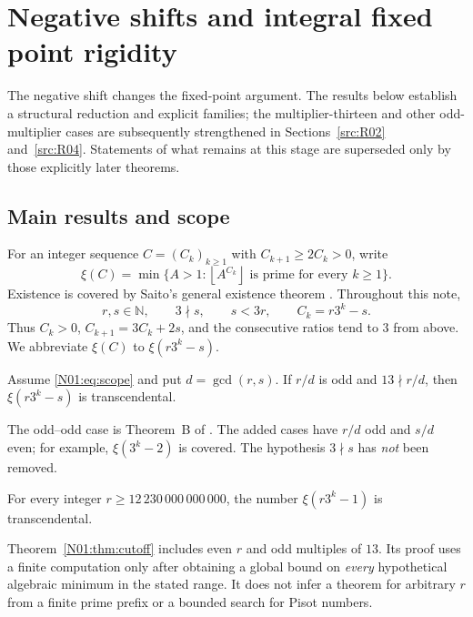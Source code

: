 \documentclass[11pt,a4paper]{article}
\theoremstyle{definition}\newtheorem{definition}[theorem]{Definition}
\theoremstyle{remark}\newtheorem{remark}[theorem]{Remark}
\newcommand{\N}{\mathbb N}\newcommand{\Z}{\mathbb Z}\newcommand{\Q}{\mathbb Q}
\newcommand{\floor}[1]{\left\lfloor#1\right\rfloor}
\begin{document}
\endgroup

\section{Negative shifts and integral fixed point rigidity}\label{src:N01}
The negative shift changes the fixed-point argument. The results below establish a structural reduction and explicit families; the multiplier-thirteen and other odd-multiplier cases are subsequently strengthened in Sections~\ref{src:R02} and~\ref{src:R04}. Statements of what remains at this stage are superseded only by those explicitly later theorems.
\medskip
\begingroup



\subsection{Main results and scope}

For an integer sequence $C=(C_k)_{k\ge1}$ with $C_{k+1}\ge2C_k>0$, write
\[
 \xi(C)=\min\{A>1:\floor{A^{C_k}}\text{ is prime for every }k\ge1\}.
\]
Existence is covered by Saito's general existence theorem
\cite[Theorem~1.3]{Saito}. Throughout this note,
\begin{equation}\label{N01:eq:scope}
 r,s\in\N,\qquad 3\nmid s,\qquad s<3r,\qquad C_k=r3^k-s.
\end{equation}
Thus $C_k>0$, $C_{k+1}=3C_k+2s$, and the consecutive ratios tend to $3$
from above. We abbreviate $\xi(C)$ to $\xi(r3^k-s)$.

\begin{mainthm}\label{N01:thm:extension}
Assume \eqref{N01:eq:scope} and put $d=\gcd(r,s)$. If $r/d$ is odd and
$13\nmid r/d$, then $\xi(r3^k-s)$ is transcendental.
\end{mainthm}

The odd--odd case is Theorem~B of \cite{K064}. The added cases have
$r/d$ odd and $s/d$ even; for example, $\xi(3^k-2)$ is covered.
The hypothesis $3\nmid s$ has \emph{not} been removed.

\begin{mainthm}\label{N01:thm:cutoff}
For every integer $r\ge12\,230\,000\,000\,000$, the number
$\xi(r3^k-1)$ is transcendental.
\end{mainthm}

Theorem~\ref{N01:thm:cutoff} includes even $r$ and odd multiples of $13$.
Its proof uses a finite computation only after obtaining a global bound on
\emph{every} hypothetical algebraic minimum in the stated range. It does not
infer a theorem for arbitrary $r$ from a finite prime prefix or a bounded
search for Pisot numbers.
\end{document}
